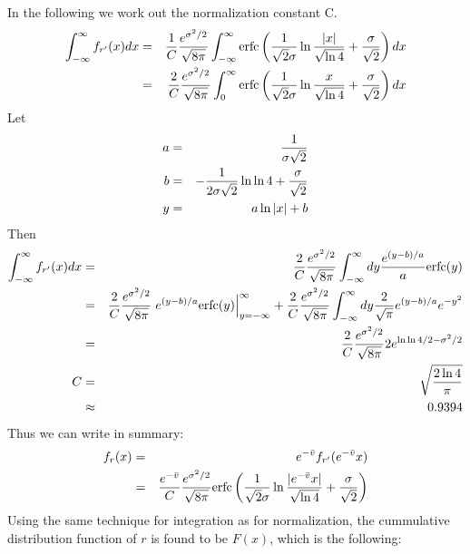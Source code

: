 In the following we work out the normalization constant C.
\begin{eqnarray*}
  \int_{-\infty}^{\infty} f_{r'}(x) dx &=& {1 \over C}{e^{\sigma^2 / 2} \over
    \sqrt{8\pi}} \int_{-\infty}^{\infty} \text{erfc} \left({1 \over
      \sqrt{2}\sigma} \ln{|x| \over \sqrt{\ln 4}} + {\sigma \over
      \sqrt{2}} \right) dx\\
  &=& {2 \over C}{e^{\sigma^2 / 2} \over
    \sqrt{8\pi}} \int_{0}^{\infty} \text{erfc} \left({1 \over
      \sqrt{2}\sigma} \ln{x \over \sqrt{\ln 4}} + {\sigma \over
      \sqrt{2}} \right) dx\\
\end{eqnarray*}
Let
\begin{eqnarray*}
  a &=& {1 \over \sigma \sqrt 2} \\
  b &=& -{1 \over 2 \sigma \sqrt 2}\ln\ln 4 + {\sigma \over \sqrt 2} \\
  y &=& a\ln|x|+b \\
\end{eqnarray*}
Then
\begin{eqnarray*}
  \int_{-\infty}^{\infty} f_{r'}(x) dx &=& {2 \over C}{e^{\sigma^2 / 2} \over
    \sqrt{8\pi}} \int_{-\infty}^{\infty} dy {e^{(y-b)/a} \over a}
  \text{erfc}(y) \\
  &=& {2 \over C}{e^{\sigma^2 / 2} \over
    \sqrt{8\pi}} \left.e^{(y-b)/a}
    \text{erfc}(y)\right|_{y=-\infty}^{\infty}
  + {2 \over C}{e^{\sigma^2 / 2} \over
    \sqrt{8\pi}} \int_{-\infty}^{\infty} dy {2 \over \sqrt \pi}
  e^{(y-b)/a} e^{-y^2} \\
  &=& {2 \over C}{e^{\sigma^2 / 2} \over \sqrt{8\pi}}  2 e^{\ln\ln 4/2
    - \sigma^2/2}\\
  C &=& \sqrt{2 \ln 4\over \pi} \\
  &\approx& 0.9394
\end{eqnarray*}
Thus we can write in summary:
\begin{eqnarray*}
  f_r(x) &=& e^{-\bar{v}} f_{r'}(e^{-\bar{v}} x) \\
    &=& {e^{-\bar{v}} \over C}{e^{\sigma^2 / 2} \over \sqrt{8\pi}}
    \text{erfc} \left({1 \over \sqrt{2}\sigma} \ln{|e^{-\bar{v}}x| \over \sqrt{\ln
          4}} + {\sigma \over \sqrt{2}}
    \right) \\
\end{eqnarray*}
Using the same technique for integration as for normalization, the
cummulative distribution function of $r$ is found to be $F(x)$,
which is the following:

